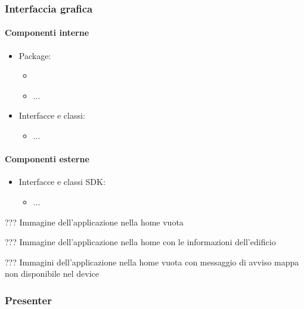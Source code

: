 \documentclass[../Funzionalita.tex]{subfiles}
\begin{document}
		\newpage
		\subsubsection{Interfaccia grafica}
		
			\paragraph*{Componenti interne}
			\begin{itemize}
			
				\item Package:
				\begin{itemize}
					\item[]
					\item[] ...
				\end{itemize}
				
				\item Interfacce e classi:
				\begin{itemize}
					\item[] ...
				\end{itemize}
				
			\end{itemize}
			
			
			\paragraph*{Componenti esterne}
			
			\begin{itemize}
				\item Interfacce e classi SDK:
				\begin{itemize}
					\item[] ...
				\end{itemize}
			\end{itemize}
			
			??? Immagine dell'applicazione nella home vuota
			
			??? Immagine dell'applicazione nella home con le informazioni dell'edificio
			
			??? Immagini dell'applicazione nella home vuota con messaggio di avviso mappa non disponibile nel device
			
		\subsubsection{Presenter}
		
\end{document}
